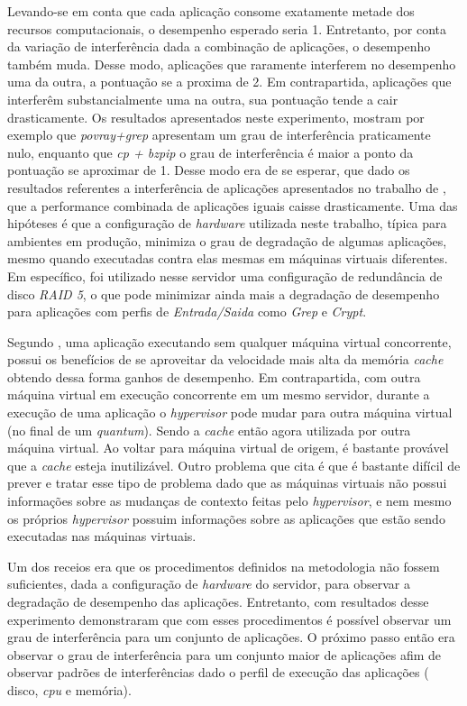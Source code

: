 Levando-se em conta que cada aplicação consome exatamente metade dos recursos computacionais, o desempenho esperado seria 1. Entretanto, por conta da variação de interferência dada a combinação de aplicações, o desempenho também muda. Desse modo, aplicações que raramente interferem no desempenho uma da outra, a pontuação se a proxima de 2. Em contrapartida, aplicações que interferêm substancialmente uma na outra, sua pontuação tende a cair drasticamente. Os resultados apresentados neste experimento, mostram por exemplo que \textit{povray+grep} apresentam um grau de interferência praticamente nulo, enquanto que \textit{cp + bzpip} o grau de interferência é maior a ponto da pontuação se aproximar de 1. Desse modo era de se esperar, que dado os resultados referentes a interferência de aplicações apresentados no trabalho de , que a performance combinada de aplicações iguais caisse drasticamente. Uma das hipóteses é que a configuração de \textit{hardware} utilizada neste trabalho, típica para ambientes em produção, minimiza o grau de degradação de algumas aplicações, mesmo quando executadas contra elas mesmas em máquinas virtuais diferentes. Em específico, foi utilizado nesse servidor uma configuração de redundância de disco \textit{RAID 5}, o que pode minimizar ainda mais a degradação de desempenho para aplicações com perfis de \textit{Entrada/Saida} como \textit{Grep} e \textit{Crypt}.

Segundo , uma aplicação executando sem qualquer máquina virtual concorrente, possui os benefícios de se aproveitar da velocidade mais alta da memória \textit{cache} obtendo dessa forma ganhos de desempenho. Em contrapartida, com outra máquina virtual em execução concorrente em um mesmo servidor, durante a execução de uma aplicação o \textit{hypervisor} pode mudar para outra máquina virtual (no final de um \textit{quantum}). Sendo a \textit{cache} então agora utilizada por outra máquina virtual. Ao voltar para máquina virtual de origem, é bastante provável que a  \textit{cache} esteja inutilizável. Outro problema que  cita é que é bastante difícil de prever e tratar esse tipo de problema dado que as máquinas virtuais não possui informações sobre as mudanças de contexto feitas pelo \textit{hypervisor}, e nem mesmo os próprios \textit{hypervisor} possuim informações sobre as aplicações que estão sendo executadas nas máquinas virtuais.

Um dos receios era que os procedimentos definidos na metodologia não fossem suficientes, dada a configuração de \textit{hardware} do servidor, para observar a degradação de desempenho das aplicações. Entretanto, com resultados desse experimento demonstraram que com esses procedimentos é possível observar um grau de interferência para um conjunto de aplicações. O próximo passo então era observar o grau de interferência para um conjunto maior de aplicações afim de observar padrões de interferências dado o perfil de execução das aplicações ( disco, \textit{cpu} e memória).

